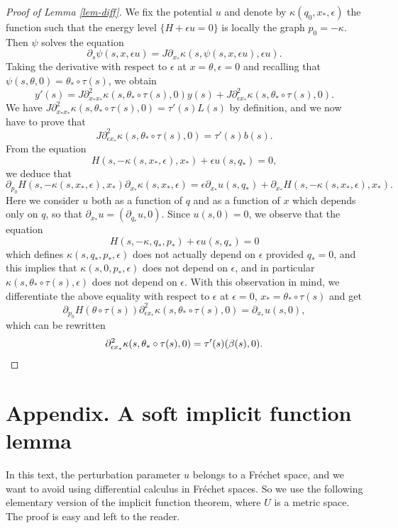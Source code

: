 \begin{proof}[Proof of Lemma \ref{lem-diff}]
We fix the potential $u$ and denote by $\kappa(q_0, x_*,\epsilon)$ the function such that the energy level $\{H+\epsilon u=0\}$ is locally the graph
$p_0=-\kappa$.
Then $\psi$ solves the equation
\[
\partial_s \psi (s,x, \epsilon u)= J\partial_{x_*}\kappa ( s, \psi(s,x,\epsilon u),\epsilon u).
\]
Taking the derivative with respect to $\epsilon$ at $x=\theta, \epsilon=0$ and recalling that $\psi(s,\theta,0)=\theta_*\circ \tau(s)$, we obtain
\[
y'(s)=J\partial^2_{x_*x_*}\kappa (s,\theta_*\circ \tau(s),0)y(s)+J\partial^2_{\epsilon x_*}\kappa(s,\theta_*\circ \tau(s),0).
\]
We have
$J\partial^2_{x_*x_*}\kappa (s,\theta_*\circ \tau(s),0)
=\tau'(s)L(s)$
by definition, and we now have to prove that
\[
J\partial^2_{\epsilon x_*}\kappa(s,\theta_*\circ \tau(s),0)=\tau'(s) b(s).
\]
From the equation
\[
H(s,-\kappa(s, x_*, \epsilon), x_*)+\epsilon u(s,q_*)=0,
\]
we deduce that
\[
\partial_{p_0}H(s,-\kappa( s, x_*,\epsilon),x_* ) \partial_{x_*} \kappa ( s, x_*, \epsilon)=
\epsilon \partial_{x_*}u(s,q_*)
+
\partial_{x_*}H (s,-\kappa( s, x_*, \epsilon),x_* ).
\]
Here we consider $u$ both as a function of $q$ and as a function of $x$ which depends only on $q$,
so that $\partial_{x_*}u=(\partial_{q_*}u, 0)$.
Since $u(s,0)=0$, we observe that the equation
\[
H(s, -\kappa, q_*, p_*)+\epsilon u(s,q_*)=0
\]
which defines $\kappa(s,q_*, p_*, \epsilon)$ does not actually depend on $\epsilon$ provided $q_*=0$, and this implies that
$\kappa(s,0, p_*,\epsilon)$ does not depend on $\epsilon$, and in particular
$\kappa(s, \theta_*\circ \tau(s), \epsilon)$ does not depend on $\epsilon$.
With this observation in mind, we
differentiate the above equality with respect to $\epsilon$ at $\epsilon=0$, $x_*=\theta_*\circ \tau(s)$ and get
\[
\partial_{p_0}H(\theta \circ \tau(s))\partial^2_{\epsilon x_*} \kappa ( s, \theta_*\circ \tau(s),0)= \partial_{x_*}u(s,0),
\]
which can be rewritten
\[
\partial^2_{\epsilon x_*} \kappa (s, \theta_*\circ \tau(s),0)= \tau'(s) (\beta(s),0).\qedhere
\]
\end{proof}

\section*{Appendix. A soft implicit function lemma}\label{ap}

In this text, the perturbation parameter $u$ belongs to a Fréchet space, and we want to avoid using differential calculus in Fréchet spaces. So we use the following elementary version of the implicit function theorem, where $U$ is a metric space. The proof is easy and left to the reader.

